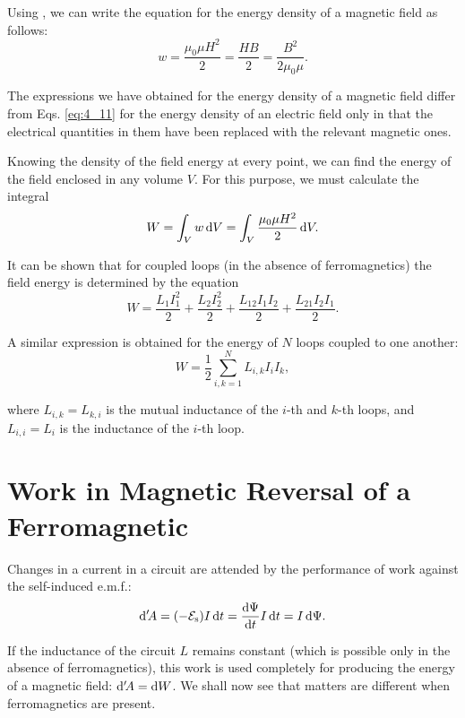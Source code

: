 \noindent
Using , we can write the equation for the energy density of a magnetic field as follows:
\begin{equation}\label{eq:8_41}
	w = \frac{\mu_0 \mu H^2}{2} = \frac{HB}{2} = \frac{B^2}{2 \mu_0 \mu}.
\end{equation}

The expressions we have obtained for the energy density of a magnetic field differ from Eqs. \eqref{eq:4_11} for the energy density of an electric field only in that the electrical quantities in them have been replaced with the relevant magnetic ones.

Knowing the density of the field energy at every point, we can find the energy of the field enclosed in any volume $V$.
For this purpose, we must calculate the integral
\begin{equation}\label{eq:8_42}
	W = \int_V w\, \mathrm{d} V = \int_V \frac{\mu_0 \mu H^2}{2}\, \mathrm{d} V.
\end{equation}

It can be shown that for coupled loops (in the absence of ferromagnetics) the field energy is determined by the equation
\begin{equation}\label{eq:8_43}
	W = \frac{L_1 I_1^2}{2} + \frac{L_2 I_2^2}{2} + \frac{L_{12} I_1 I_2}{2} + \frac{L_{21} I_2 I_1}{2}.
\end{equation}

\noindent
A similar expression is obtained for the energy of $N$ loops coupled to one another:
\begin{equation}\label{eq:8_44}
	W = \frac{1}{2} \sum_{i,k=1}^N L_{i,k} I_i I_k,
\end{equation}

\noindent
where $L_{i,k}=L_{k,i}$ is the mutual inductance of the $i$-th and $k$-th loops, and $L_{i,i}=L_i$ is the inductance of the $i$-th loop.

\section{Work in Magnetic Reversal of a Ferromagnetic}\label{sec:8_9}

Changes in a current in a circuit are attended by the performance of work against the self-induced e.m.f.:
\begin{equation}\label{eq:8_45}
	\mathrm{d}'\!A = (-\mathcal{E}_{\text{s}}) I\, \mathrm{d} t = \dfrac{\mathrm{d}\Psi}{\mathrm{d} t} I\, \mathrm{d} t = I\, \mathrm{d}\Psi.
\end{equation}

\noindent
If the inductance of the circuit $L$ remains constant (which is possible only in the absence of ferromagnetics), this work is used completely for producing the energy of a magnetic field: $\mathrm{d}'\!A=\mathrm{d} W$.
We shall now see that matters are different when ferromagnetics are present.

